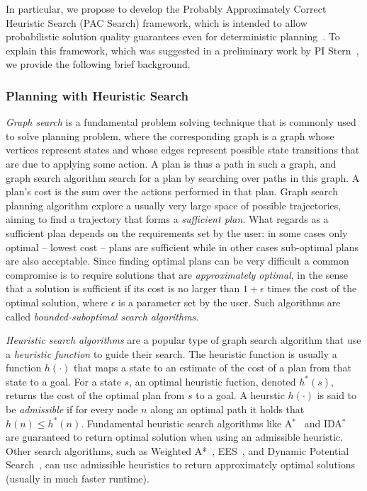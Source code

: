 \documentclass[12pt]{article}
\begin{document}
In particular, we propose to develop the Probably Approximately Correct Heuristic Search (PAC Search) framework, which is intended to allow probabilistic solution quality guarantees even for deterministic planning~\cite{stern2011probably,stern2012search}. To explain this framework, which was suggested in a preliminary work by PI Stern~\cite{stern2011probably,stern2012search}, we provide the following brief background. 

\subsubsection{Planning with Heuristic Search}
{\em Graph search} is a fundamental problem solving technique that is commonly used to solve planning problem, where the corresponding graph is a graph whose vertices represent states and whose edges represent possible state transitions that are due to applying some action. A plan is thus a path in such a graph, and graph search algorithm search for a plan by searching over paths in this graph. A plan's cost is the sum over the actions performed in that plan. Graph search planning algorithm explore a usually very large space of possible trajectories, aiming to find a trajectory that forms a {\em sufficient plan}. What regards as a sufficient plan depends on the requirements set by the user: in some cases only optimal -- lowest cost -- plans are sufficient while in other cases sub-optimal plans are also acceptable. Since finding optimal plans can be very difficult a common compromise is to require solutions that are {\em approximately optimal}, in the sense that a solution is sufficient if its cost is no larger than $1+\epsilon$ times the cost of the optimal solution, where $\epsilon$ is a parameter set by the user. Such algorithms are called {\em bounded-suboptimal search algorithms}. 


{\em Heuristic search algorithms} are a popular type of graph search algorithm that use a {\em heuristic function} to guide their search. The heuristic function is usually a function $h(\cdot)$ that maps a state to an estimate of the cost of a plan from that state to a goal. For a state $s$, an optimal heuristic fuction, denoted $h^*(s)$, returns the cost of the optimal plan from $s$ to a goal. A heurstic $h(\cdot)$  is said to be {\em admissible} if for every node $n$ along an optimal path it holds that $h(n)\leq h^*(n)$. Fundamental heuristic search algorithms like A$^*$~\cite{hart1968formal} and IDA$^*$~\cite{korf1985depth} are guaranteed to return optimal solution when using an admissible heuristic. Other search algorithms, such as Weighted A*~\cite{pohl1973avoidance}, EES~\cite{thayer2011bounded}, and Dynamic Potential Search~\cite{gilon2016dynamic}, can use admissible heuristics to return approximately optimal solutions (usually in much faster runtime). 
\end{document}
